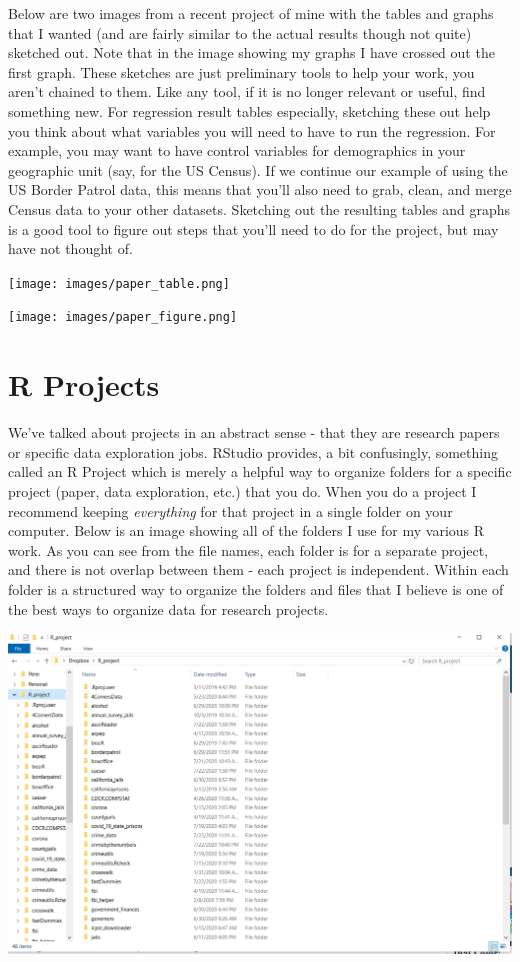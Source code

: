 \documentclass[
  12pt,
]{book}
\begin{document}
Below are two images from a recent project of mine with the tables and graphs that I wanted (and are fairly similar to the actual results though not quite) sketched out. Note that in the image showing my graphs I have crossed out the first graph. These sketches are just preliminary tools to help your work, you aren't chained to them. Like any tool, if it is no longer relevant or useful, find something new. For regression result tables especially, sketching these out help you think about what variables you will need to have to run the regression. For example, you may want to have control variables for demographics in your geographic unit (say, for the US Census). If we continue our example of using the US Border Patrol data, this means that you'll also need to grab, clean, and merge Census data to your other datasets. Sketching out the resulting tables and graphs is a good tool to figure out steps that you'll need to do for the project, but may have not thought of.

\texttt{[image: images/paper\_table.png]}

\texttt{[image: images/paper\_figure.png]}

\hypertarget{r-projects}{%
\section{R Projects}\label{r-projects}}

We've talked about projects in an abstract sense - that they are research papers or specific data exploration jobs. RStudio provides, a bit confusingly, something called an R Project which is merely a helpful way to organize folders for a specific project (paper, data exploration, etc.) that you do. When you do a project I recommend keeping \emph{everything} for that project in a single folder on your computer. Below is an image showing all of the folders I use for my various R work. As you can see from the file names, each folder is for a separate project, and there is not overlap between them - each project is independent. Within each folder is a structured way to organize the folders and files that I believe is one of the best ways to organize data for research projects.

\includegraphics{images/projects.PNG}
\end{document}
